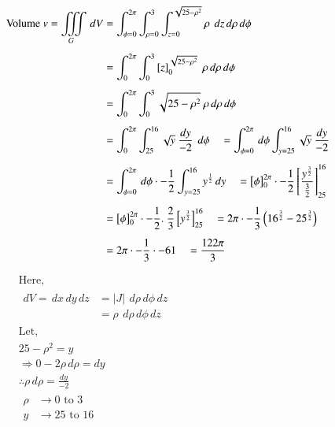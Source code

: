 \documentclass[11pt]{extarticle}
\newcommand{\dx}{{\,dx}}
\newcommand{\dy}{{\,dy}}
\newcommand{\dz}{{\,dz}}
\newcommand{\dphi}{{\,d\phi}}
\newcommand{\drho}{{\,d\rho}}
\newcommand{\miiint}{\iiint\displaylimits}
\begin{document}
\begin{minipage}[t]{0.66\linewidth}
\noindent
   \begin{adjustbox}{valign=t}
      $\begin{aligned}
         \text{Volume } v=\miiint_G \,dV
         & =\int_{\phi=0}^{2 \pi} \int_{\rho=0}^3 \int_{z=0}^{\sqrt{25-\rho^2}} \rho \ \dz\drho\dphi \\[1ex]
         & =\int_0^{2 \pi} \int_0^3 \left[z\right]_0^{\sqrt{25-\rho^2}} \ \rho  \drho\dphi \\[1ex]
         & =\int_0^{2 \pi} \int_0^3 \sqrt{25-\rho^2} \ \rho  \drho\dphi \\[1ex]
         & =\int_0^{2 \pi} \int_{25}^{16} \sqrt{y} \ \frac{dy}{-2} \ \dphi 
         \quad =\int_{\phi=0}^{2 \pi} \dphi \int_{y=25}^{16} \sqrt{y} \ \frac{dy}{-2}\\[1ex]
         & = \int_{\phi=0}^{2 \pi} \dphi
         \cdot -\frac{1}{2}\int_{y=25}^{16} y^{\frac{1}{2}} \dy \quad
         = \left[\phi\right]_{0}^{2 \pi} \cdot -\frac{1}{2}
          \left[\frac{y^{\frac{3}{2}}}{\frac{3}{2}}\right]_{25}^{16} \\[1ex]
         & = \left[\phi\right]_{0}^{2 \pi} \cdot -\frac{1}{2}.\ \frac{2}{3}
          \left[y^{\frac{3}{2}}\right]_{25}^{16} \quad
         = 2\pi \cdot -\frac{1}{3} \left(16^{\frac{3}{2}}-25^{\frac{3}{2}}\right) \\[1ex]
         & = 2\pi \cdot -\frac{1}{3} \cdot -61 \quad
         = \frac{122\pi}{3}
         \end{aligned}$
   \end{adjustbox}
\end{minipage}
\begin{minipage}[t]{0.32\linewidth}
\noindent
   \begin{adjustbox}{valign=t}
      \divideX
      $\begin{aligned}
         & \text {Here, } \\
         & \begin{array}{ll}
            dV = \dx\dy\dz & = |J| \ \drho\dphi\dz\\
             & = \rho\ \drho\dphi\dz
         \end{array}\\
         & \text {Let, } \\
         & 25-\rho^2=y \\
         & \Rightarrow 0-2 \rho \drho = dy \\
         & \therefore \rho \drho=\frac{dy}{-2} \\[2ex]
         & \begin{array}{ll}
         \rho & \rightarrow 0 \text { \ to \ } 3 \\
         y & \rightarrow 25 \text { \ to \ } 16
         \end{array} \\
         \end{aligned}$
   \end{adjustbox}
\end{minipage}
\end{document}
